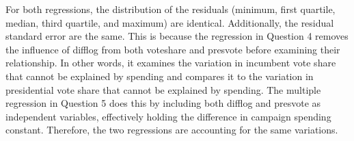 \documentclass[12pt,letterpaper]{article}
\begin{document}
\begin{enumerate}
		\noindent For both regressions, the distribution of the residuals (minimum, first quartile, median, third quartile, and maximum) are identical. Additionally, the residual standard error are the same. This is because the regression in Question 4 removes the influence of difflog from both voteshare and presvote before examining their relationship. In other words, it examines the variation in incumbent vote share that cannot be explained by spending and compares it to the variation in presidential vote share that cannot be explained by spending. The multiple regression in Question 5 does this by including both difflog and presvote as independent variables, effectively holding the difference in campaign spending constant. Therefore, the two regressions are accounting for the same variations.
	\end{enumerate}
\end{document}
